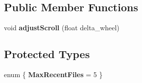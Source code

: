 \subsection*{Public Member Functions}
\begin{DoxyCompactItemize}
\item 
\hypertarget{classofeli_1_1_image_viewer_ad43b24d179c58e710b55fda869cc9f12}{void {\bfseries adjust\-Scroll} (float delta\-\_\-wheel)}\label{classofeli_1_1_image_viewer_ad43b24d179c58e710b55fda869cc9f12}

\end{DoxyCompactItemize}
\subsection*{Protected Types}
\begin{DoxyCompactItemize}
\item 
enum \{ {\bfseries Max\-Recent\-Files} = 5
 \}
\end{DoxyCompactItemize}
